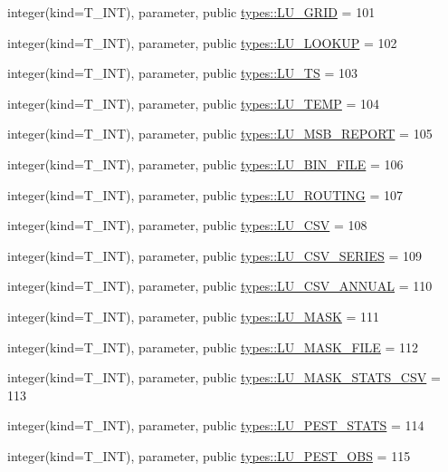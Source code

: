 \begin{DoxyCompactItemize}
integer(kind=T\_\-INT), parameter, public \hyperlink{namespacetypes_a47b83df3491e1221a3ac68ddffeaa66d}{types::LU\_\-GRID} = 101
\item 
integer(kind=T\_\-INT), parameter, public \hyperlink{namespacetypes_ae0b1a59e6856a4e2976c65cfe6e7829a}{types::LU\_\-LOOKUP} = 102
\item 
integer(kind=T\_\-INT), parameter, public \hyperlink{namespacetypes_ade712eb10655f5aee16cf18185a3681a}{types::LU\_\-TS} = 103
\item 
integer(kind=T\_\-INT), parameter, public \hyperlink{namespacetypes_ad52e13854a39857c28903d06b6743e5c}{types::LU\_\-TEMP} = 104
\item 
integer(kind=T\_\-INT), parameter, public \hyperlink{namespacetypes_aa997f1b516b3fe69d84925827bb1f85f}{types::LU\_\-MSB\_\-REPORT} = 105
\item 
integer(kind=T\_\-INT), parameter, public \hyperlink{namespacetypes_aa6744b73e58d8433783e0f423c3a1a72}{types::LU\_\-BIN\_\-FILE} = 106
\item 
integer(kind=T\_\-INT), parameter, public \hyperlink{namespacetypes_a94d564eb241f924a1114890a7e8a6901}{types::LU\_\-ROUTING} = 107
\item 
integer(kind=T\_\-INT), parameter, public \hyperlink{namespacetypes_a02191e0a119334a646624bf66c6032d0}{types::LU\_\-CSV} = 108
\item 
integer(kind=T\_\-INT), parameter, public \hyperlink{namespacetypes_a3b64a784a138287166d3c1717c8fc641}{types::LU\_\-CSV\_\-SERIES} = 109
\item 
integer(kind=T\_\-INT), parameter, public \hyperlink{namespacetypes_afc45706ea53210eeba59fbe5b2b3856c}{types::LU\_\-CSV\_\-ANNUAL} = 110
\item 
integer(kind=T\_\-INT), parameter, public \hyperlink{namespacetypes_adf298bd69751153dbb8bd21ec8bbc42b}{types::LU\_\-MASK} = 111
\item 
integer(kind=T\_\-INT), parameter, public \hyperlink{namespacetypes_a6fbb2101460a97abcc5f4ee9055e7e63}{types::LU\_\-MASK\_\-FILE} = 112
\item 
integer(kind=T\_\-INT), parameter, public \hyperlink{namespacetypes_abaf10a4311ff42ab5244e8246c6a5200}{types::LU\_\-MASK\_\-STATS\_\-CSV} = 113
\item 
integer(kind=T\_\-INT), parameter, public \hyperlink{namespacetypes_a8ef944fc47b1e170df34b54eba5a9433}{types::LU\_\-PEST\_\-STATS} = 114
\item 
integer(kind=T\_\-INT), parameter, public \hyperlink{namespacetypes_afb3d31ed372313e730716e33e42c735a}{types::LU\_\-PEST\_\-OBS} = 115

\end{DoxyCompactItemize}
